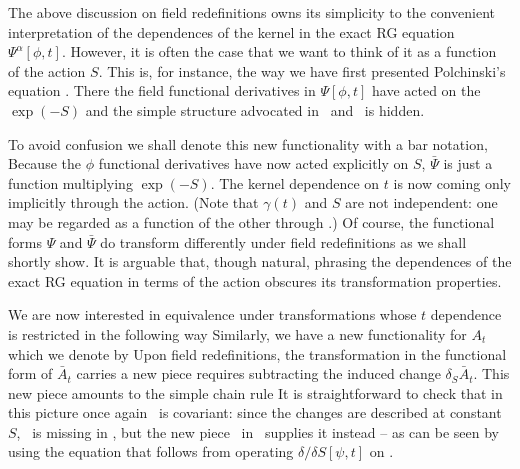
The above discussion on field redefinitions owns its   simplicity to
 the convenient interpretation of the dependences of the kernel in the exact RG
equation $\Psi^\alpha[\phi,t]$. However, it is often the case that
we want to think of it as a function of the action $S$. 
This is, for instance, the
way we have first presented Polchinski's equation \polchinski. There 
the field functional derivatives in $\Psi[\phi,t]$ have acted on the
$\exp(-S)$ and the simple structure advocated in \wegner\ and 
\psidef\ is hidden.

To avoid 
confusion we shall denote this new functionality with a bar notation,
\eqn{}
Because the $\phi$ functional derivatives have now acted explicitly on
$S$, $\bar\Psi$ is just a function multiplying $\exp (-S)$.
The kernel dependence on $t$ is now  coming only 
implicitly through the action. (Note that $\gamma(t)$ and $S$ are not
independent: one may be regarded as a function of the other through
\polchinski.) Of course, the functional forms $\Psi$ and $\bar\Psi$ do 
transform differently under field redefinitions as we shall shortly
show. It is arguable that, though natural, phrasing the dependences
of the exact RG equation in terms of the action obscures its
transformation properties.




We are now  interested in equivalence under
transformations whose $t$ dependence is restricted in the following way
\eqn{}
 Similarly, we have a new functionality for $A_t$ which we denote by
\eqn{}
Upon field redefinitions, the transformation in the functional
form of $\bar A_t$ carries a new piece 
\eqn{}
\ie requires subtracting the induced change $\delta_S \bar A_t$. 
This new piece amounts to the simple chain rule
\eqn{}
It is straightforward
to check that in this picture once again \simplerg\ is covariant:
since the changes are described at constant $S$, \gas\ is missing in  \gaerg,
but the new piece \chainrule\ in \fsda\ supplies it instead -- as can be seen
by using the equation that follows from operating 
$\delta/\delta S[\psi,t]$ on \simplerg. 
 
